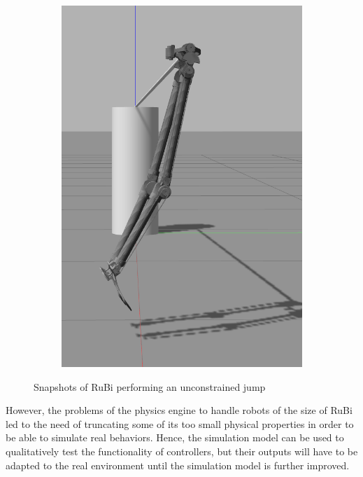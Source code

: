 \begin{figure}[h]
\begin{subfigure}{.19\textwidth}
    \includegraphics[width=\linewidth]{figures/gazebo_jumping_5.png}
  \end{subfigure}
  \caption{Snapshots of RuBi performing an unconstrained jump}
  \label{fig:RuBi_jump_sequence}
\end{figure}  



However, the problems of the physics engine to handle robots of the size of RuBi led to the need of truncating some of its too small physical properties in order to be able to simulate real behaviors.
Hence, the simulation model can be used to qualitatively test the functionality of controllers, but their outputs will have to be adapted to the real environment until the simulation model is further improved.

